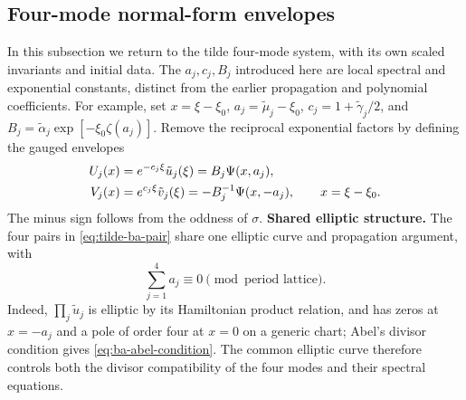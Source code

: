 \documentclass[11pt,a4paper]{article}
\begin{document}
\subsection{Four-mode normal-form envelopes}\label{supp:subsec:fwm-ba}
In this subsection we return to the tilde four-mode system, with its own scaled invariants and initial data.
The $a_j,c_j,B_j$ introduced here are local spectral and exponential constants, distinct from the earlier propagation and polynomial coefficients.
For example, set $x=\xi-\xi_0$, $a_j=\tilde\mu_j-\xi_0$, $c_j=1+\tilde\gamma_j/2$, and $B_j=\tilde\alpha_j\exp[-\xi_0\zeta(a_j)]$.
Remove the reciprocal exponential factors by defining the gauged envelopes
\begin{align}
U_j(x)&=e^{-c_j\xi}\tilde u_j(\xi)=B_j\Psi(x,a_j),\notag\\
V_j(x)&=e^{c_j\xi}\tilde v_j(\xi)=-B_j^{-1}\Psi(x,-a_j),
\qquad x=\xi-\xi_0.
\label{eq:tilde-ba-pair}
\end{align}
The minus sign follows from the oddness of $\sigma$.
\noindent\textbf{Shared elliptic structure.}
The four pairs in \eqref{eq:tilde-ba-pair} share one elliptic curve and propagation argument, with
\begin{equation}
\sum_{j=1}^4a_j\equiv0\pmod{\text{period lattice}}.
\label{eq:ba-abel-condition}
\end{equation}
Indeed, $\prod_j\tilde u_j$ is elliptic by its Hamiltonian product relation, and has zeros at $x=-a_j$ and a pole of order four at $x=0$ on a generic chart; Abel's divisor condition gives \eqref{eq:ba-abel-condition}.
The common elliptic curve therefore controls both the divisor compatibility of the four modes and their spectral equations.
\end{document}
